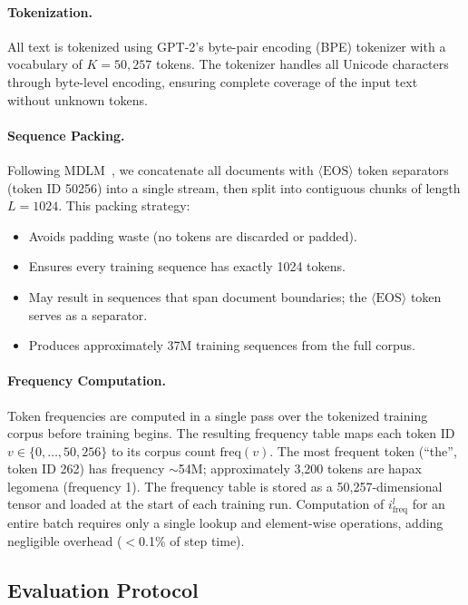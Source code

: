 \paragraph{Tokenization.} All text is tokenized using GPT-2's byte-pair encoding (BPE) tokenizer with a vocabulary of $K = 50{,}257$ tokens. The tokenizer handles all Unicode characters through byte-level encoding, ensuring complete coverage of the input text without unknown tokens.

\paragraph{Sequence Packing.} Following MDLM~\citep{mdlm}, we concatenate all documents with $\langle \text{EOS} \rangle$ token separators (token ID 50256) into a single stream, then split into contiguous chunks of length $L = 1024$. This packing strategy:
\begin{itemize}[leftmargin=*,itemsep=1pt]
    \item Avoids padding waste (no tokens are discarded or padded).
    \item Ensures every training sequence has exactly 1024 tokens.
    \item May result in sequences that span document boundaries; the $\langle \text{EOS} \rangle$ token serves as a separator.
    \item Produces approximately 37M training sequences from the full corpus.
\end{itemize}

\paragraph{Frequency Computation.} Token frequencies are computed in a single pass over the tokenized training corpus before training begins. The resulting frequency table maps each token ID $v \in \{0, \ldots, 50{,}256\}$ to its corpus count $\text{freq}(v)$. The most frequent token (``\textvisiblespace the'', token ID 262) has frequency ${\sim}$54M; approximately 3,200 tokens are hapax legomena (frequency 1). The frequency table is stored as a 50,257-dimensional tensor and loaded at the start of each training run. Computation of $i^l_{\text{freq}}$ for an entire batch requires only a single lookup and element-wise operations, adding negligible overhead ($<$0.1\% of step time).

\subsection{Evaluation Protocol}

